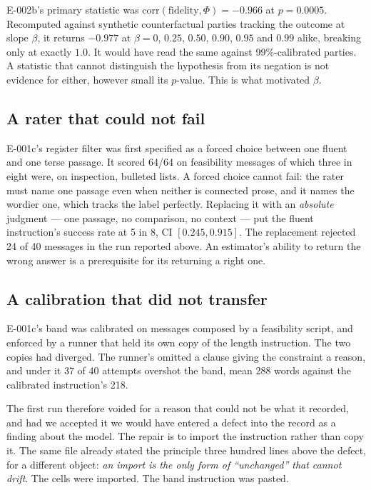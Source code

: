 \documentclass[11pt]{article}
\begin{document}
E-002b's primary statistic was $\mathrm{corr}(\text{fidelity}, \Phi) = -0.966$ at
$p = 0.0005$. Recomputed against synthetic counterfactual parties tracking the
outcome at slope $\beta$, it returns $-0.977$ at
$\beta = 0$, $0.25$, $0.50$, $0.90$, $0.95$ and $0.99$ alike, breaking only at
exactly $1.0$. It would have read the
same against 99\%-calibrated parties. A statistic that cannot distinguish the
hypothesis from its negation is not evidence for either, however small its
$p$-value. This is what motivated $\beta$.

\subsection{A rater that could not fail}

E-001c's register filter was first specified as a forced choice between one
fluent and one terse passage. It scored 64/64 on feasibility messages of which
three in eight were, on inspection, bulleted lists. A forced choice cannot fail:
the rater must name one passage even when neither is connected prose, and it
names the wordier one, which tracks the label perfectly. Replacing it with an
\emph{absolute} judgment --- one passage, no comparison, no context --- put the
fluent instruction's success rate at 5 in 8, CI $[0.245, 0.915]$. The replacement
rejected 24 of 40 messages in the run reported above. An estimator's ability to
return the wrong answer is a prerequisite for its returning a right one.

\subsection{A calibration that did not transfer}

E-001c's band was calibrated on messages composed by a feasibility script, and
enforced by a runner that held its own copy of the length instruction. The two
copies had diverged. The runner's omitted a clause giving the constraint a
reason, and under it 37 of 40 attempts overshot the band, mean 288 words against
the calibrated instruction's 218.

The first run therefore voided for a reason that could not be what it recorded,
and had we accepted it we would have entered a defect into the record as a
finding about the model. The repair is to import the instruction rather than copy
it. The same file already stated the principle three hundred lines above the
defect, for a different object: \emph{an import is the only form of ``unchanged''
that cannot drift}. The cells were imported. The band instruction was pasted.
\end{document}
